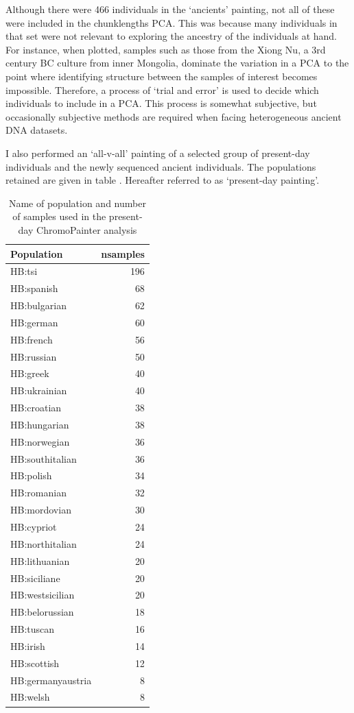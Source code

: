 Although there were 466 individuals in the `ancients' painting, not all of these were included in the chunklengths PCA. This was because many individuals in that set were not relevant to exploring the ancestry of the individuals at hand. For instance, when plotted, samples such as those from the Xiong Nu, a 3rd century BC culture from inner Mongolia, dominate the variation in a PCA to the point where identifying structure between the samples of interest becomes impossible. Therefore, a process of `trial and error' is used to decide which individuals to include in a PCA. This process is somewhat subjective, but occasionally subjective methods are required when facing heterogeneous ancient DNA datasets. 

I also performed an `all-v-all' painting of a selected group of present-day individuals and the newly sequenced ancient individuals. The populations retained are given in table . Hereafter referred to as `present-day painting'.

\begin{table}
\small
\begin{tabular}{l|r}
\hline
Population & nsamples\\
\hline
HB:tsi & 196\\
\hline
HB:spanish & 68\\
\hline
HB:bulgarian & 62\\
\hline
HB:german & 60\\
\hline
HB:french & 56\\
\hline
HB:russian & 50\\
\hline
HB:greek & 40\\
\hline
HB:ukrainian & 40\\
\hline
HB:croatian & 38\\
\hline
HB:hungarian & 38\\
\hline
HB:norwegian & 36\\
\hline
HB:southitalian & 36\\
\hline
HB:polish & 34\\
\hline
HB:romanian & 32\\
\hline
HB:mordovian & 30\\
\hline
HB:cypriot & 24\\
\hline
HB:northitalian & 24\\
\hline
HB:lithuanian & 20\\
\hline
HB:siciliane & 20\\
\hline
HB:westsicilian & 20\\
\hline
HB:belorussian & 18\\
\hline
HB:tuscan & 16\\
\hline
HB:irish & 14\\
\hline
HB:scottish & 12\\
\hline
HB:germanyaustria & 8\\
\hline
HB:welsh & 8\\
\hline
\end{tabular}
\caption{Name of population and number of samples used in the present-day ChromoPainter analysis}
\end{table}

